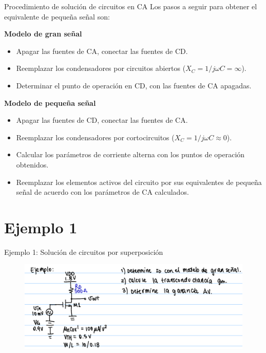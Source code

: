 \documentclass[t,aspectratio=169]{beamer}
\begin{document}
\begin{frame}{Procedimiento de solución de circuitos en CA}
Los pasos a seguir para obtener el equivalente de pequeña señal son:

\vspace{5mm}
\textbf{Modelo de gran señal}

\begin{itemize}
    \item Apagar las fuentes de CA, conectar las fuentes de CD.
    \item Reemplazar los condensadores por circuitos abiertos ($X_C = 1/j\omega{}C = \infty$).
    \item Determinar el punto de operación en CD, con las fuentes de CA apagadas.
\end{itemize}

\vspace{5mm}
\textbf{Modelo de pequeña señal}

\begin{itemize}
    \item Apagar las fuentes de CD, conectar las fuentes de CA.
    \item Reemplazar los condensadores por cortocircuitos ($X_C = 1/j\omega{}C \approx 0$).
    \item Calcular los parámetros de corriente alterna con los puntos de operación obtenidos.
    \item Reemplazar los elementos activos del circuito por sus equivalentes de pequeña señal de acuerdo con los parámetros de CA calculados.

\end{itemize}

\end{frame}




\section{Ejemplo 1}
\begin{frame}{Ejemplo 1: Solución de circuitos por superposición}

\begin{figure}[H]
    \centering
    \includegraphics[width=\textwidth]{figuras/ejemplo_1_1.png}
\end{figure}

\end{frame}
\end{document}

